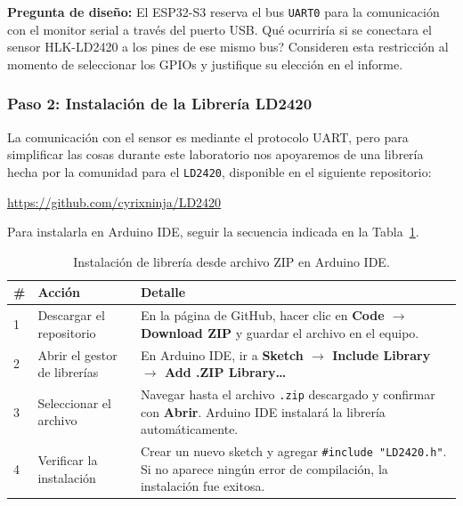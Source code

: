 \documentclass[12pt,leqno]{article}
\begin{document}
\noindent\textbf{Pregunta de dise\~no:} El ESP32-S3 reserva el bus \texttt{UART0}
para la comunicaci\'on con el monitor serial a trav\'es del puerto USB.
\textquestiondown Qu\'e ocurrir\'ia si se conectara el sensor HLK-LD2420 a los
pines de ese mismo bus? Consideren esta restricci\'on al momento de seleccionar
los GPIOs y justifique su elecci\'on en el informe.

\subsubsection*{Paso 2: Instalaci\'on de la Librer\'ia LD2420}

La comunicaci\'on con el sensor es mediante el protocolo UART, pero para simplificar las cosas durante este laboratorio nos apoyaremos de una librería hecha por la comunidad para el \texttt{LD2420}, disponible en el siguiente repositorio:

\begin{center}
    \url{https://github.com/cyrixninja/LD2420}
\end{center}

Para instalarla en Arduino IDE, seguir la secuencia indicada en la
Tabla~\ref{tab:instalacion-zip}.

\begin{table}[h]
\centering
\begin{tabular}{|p{0.8cm}|p{4.5cm}|p{8cm}|}
\hline
\textbf{\#} & \textbf{Acci\'on} & \textbf{Detalle} \\
\hline
1 & Descargar el repositorio &
    En la p\'agina de GitHub, hacer clic en \textbf{Code $\rightarrow$ Download ZIP}
    y guardar el archivo en el equipo. \\
\hline
2 & Abrir el gestor de librer\'ias &
    En Arduino IDE, ir a \textbf{Sketch $\rightarrow$ Include Library
    $\rightarrow$ Add .ZIP Library\ldots} \\
\hline
3 & Seleccionar el archivo &
    Navegar hasta el archivo \texttt{.zip} descargado y confirmar con
    \textbf{Abrir}. Arduino IDE instalar\'a la librer\'ia autom\'aticamente. \\
\hline
4 & Verificar la instalaci\'on &
    Crear un nuevo sketch y agregar \texttt{\#include "LD2420.h"}.
    Si no aparece ning\'un error de compilaci\'on, la instalaci\'on
    fue exitosa. \\
\hline
\end{tabular}
\caption{Instalaci\'on de librer\'ia desde archivo ZIP en Arduino IDE.}
\label{tab:instalacion-zip}
\end{table}
\end{document}
